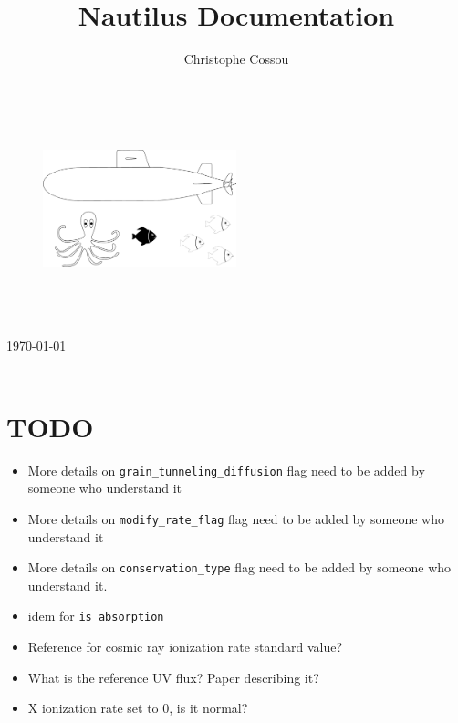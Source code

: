 \documentclass[english,a4paper,twoside]{article}
\title{Nautilus Documentation}
\author{Christophe Cossou}
\begin{document}
\begin{titlepage}
\begin{center}
~
\vfill
\begin{figure}[t]
\centering
\includegraphics[width=0.5\textwidth]{figures/nautilus_logo.pdf}%
\end{figure}

\HRule \\[0.4cm]
{ \huge \bfseries \makeatletter\@title\makeatother}\\[0.4cm]

\HRule \\[0.75cm]
{\large \today}\\[0.75cm]
\makeatletter
\@author
\makeatother
\vfill
\vfill
~


\end{center}
\end{titlepage}

\cleardoublepage

\tableofcontents

\cleardoublepage

\section{TODO}
\begin{itemize}
\item More details on \verb|grain_tunneling_diffusion| flag need to be added by someone who understand it
\item More details on \verb|modify_rate_flag| flag need to be added by someone who understand it
\item More details on \verb|conservation_type| flag need to be added by someone who understand it.
\item idem for \verb|is_absorption|
\item Reference for cosmic ray ionization rate standard value?
\item What is the reference UV flux? Paper describing it?
\item X ionization rate set to 0, is it normal?
\end{itemize}
\end{document}
